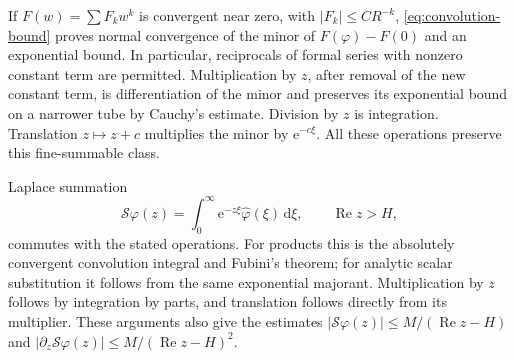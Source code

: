\documentclass[11pt,a4paper]{article}
\numberwithin{equation}{section}
\theoremstyle{definition}
\theoremstyle{remark}
\theoremstyle{definition}
\newcommand{\e}{\mathrm e}
\newcommand{\dd}{\mathrm d}
\newcommand{\Ree}{\operatorname{Re}}
\begin{document}
If $F(w)=\sum F_kw^k$ is convergent near zero, with
$|F_k|\le C R^{-k}$, \eqref{eq:convolution-bound} proves normal convergence
of the minor of $F(\varphi)-F(0)$ and an exponential bound. In particular,
reciprocals of formal series with nonzero constant term are permitted.
Multiplication by $z$, after removal of the new constant term, is
differentiation of the minor and preserves its exponential bound on a
narrower tube by Cauchy's estimate. Division by $z$ is integration.
Translation $z\mapsto z+c$ multiplies the minor by $\e^{-c\xi}$.
All these operations preserve this fine-summable class.

Laplace summation
\[
 \mathcal S\varphi(z)=\int_0^\infty
                  \e^{-z\xi}\widehat\varphi(\xi)\,\dd\xi,
 \qquad \Ree z>H,
\]
commutes with the stated operations. For products this is the
absolutely convergent convolution integral and Fubini's theorem; for
analytic scalar substitution it follows from the same exponential
majorant. Multiplication by $z$ follows by integration by parts, and
translation follows directly from its multiplier. These arguments also
give the estimates $|\mathcal S\varphi(z)|\le M/(\Ree z-H)$ and
$|\partial_z\mathcal S\varphi(z)|\le M/(\Ree z-H)^2$.
\end{document}
